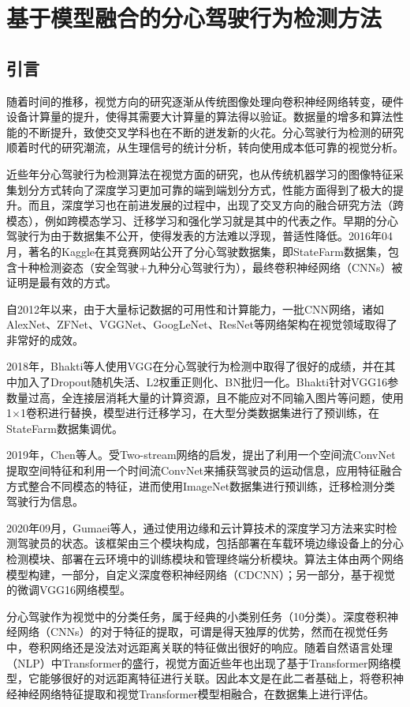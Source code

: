 \chapter{基于模型融合的分心驾驶行为检测方法}


\section{引言}

随着时间的推移，视觉方向的研究逐渐从传统图像处理向卷积神经网络转变，硬件设备计算量的提升，使得其需要大计算量的算法得以验证。数据量的增多和算法性能的不断提升，致使交叉学科也在不断的迸发新的火花。分心驾驶行为检测的研究顺着时代的研究潮流，从生理信号的统计分析，转向使用成本低可靠的视觉分析。 

近些年分心驾驶行为检测算法在视觉方面的研究，也从传统机器学习的图像特征采集划分方式转向了深度学习更加可靠的端到端划分方式，性能方面得到了极大的提升。而且，深度学习也在前进发展的过程中，出现了交叉方向的融合研究方法（跨模态），例如跨模态学习、迁移学习和强化学习就是其中的代表之作。早期的分心驾驶行为由于数据集不公开，使得发表的方法难以浮现，普适性降低。2016年04月，著名的Kaggle在其竞赛网站公开了分心驾驶数据集，即StateFarm数据集，包含十种检测姿态（安全驾驶+九种分心驾驶行为），最终卷积神经网络（CNNs）被证明是最有效的方式\cite{46}。

自2012年以来，由于大量标记数据的可用性和计算能力，一批CNN网络，诸如AlexNet、ZFNet、VGGNet、GoogLeNet、ResNet等网络架构在视觉领域取得了非常好的成效。

2018年，Bhakti等人\cite{47}使用VGG在分心驾驶行为检测中取得了很好的成绩，并在其中加入了Dropout随机失活、L2权重正则化、BN批归一化。Bhakti针对VGG16参数量过高，全连接层消耗大量的计算资源，且不能应对不同输入图片等问题，使用1×1卷积进行替换，模型进行迁移学习，在大型分类数据集进行了预训练，在StateFarm数据集调优。

2019年，Chen等人\cite{49}。受Two-stream网络的启发，提出了利用一个空间流ConvNet提取空间特征和利用一个时间流ConvNet来捕获驾驶员的运动信息，应用特征融合方式整合不同模态的特征，进而使用ImageNet数据集进行预训练，迁移检测分类驾驶行为信息。

2020年09月，Gumaei等人\cite{50}，通过使用边缘和云计算技术的深度学习方法来实时检测驾驶员的状态。该框架由三个模块构成，包括部署在车载环境边缘设备上的分心检测模块、部署在云环境中的训练模块和管理终端分析模块。算法主体由两个网络模型构建，一部分，自定义深度卷积神经网络（CDCNN）；另一部分，基于视觉的微调VGG16网络模型。

分心驾驶作为视觉中的分类任务，属于经典的小类别任务（10分类）。深度卷积神经网络（CNNs）的对于特征的提取，可谓是得天独厚的优势，然而在视觉任务中，卷积网络还是没法对远距离关联的特征做出很好的响应。随着自然语言处理（NLP）中Transformer的盛行，视觉方面近些年也出现了基于Transformer网络模型，它能够很好的对远距离特征进行关联。因此本文是在此二者基础上，将卷积神经神经网络特征提取和视觉Transformer模型相融合，在数据集上进行评估。


